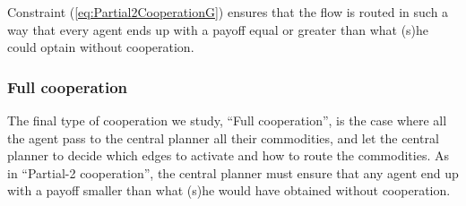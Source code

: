 \documentclass{article}
\begin{document}
Constraint (\ref{eq:Partial2CooperationG}) ensures that the flow is routed in such a way that every agent ends up with a payoff equal or greater than what (s)he could
optain without cooperation.

\subsubsection*{Full cooperation}


The final type of cooperation we study, ``Full cooperation'', is the case where all the agent pass to the central planner all their commodities,
and let the central planner to decide which edges to activate and how to route the commodities.
As in ``Partial-2 cooperation'', the central planner must ensure that any agent end up with a payoff
smaller than what (s)he would have obtained without cooperation.
\end{document}
